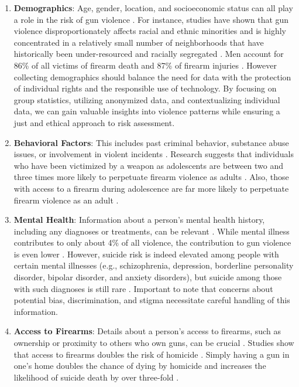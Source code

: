 \documentclass[11pt]{article}
\begin{document}
\begin{enumerate}
\item \textbf{Demographics}: Age, gender, location, and socioeconomic status can all play a role in the risk of gun violence \cite{OToole_2023,kegler2023notes}. For instance, studies have shown that gun violence disproportionately affects racial and ethnic minorities and is highly concentrated in a relatively small number of neighborhoods that have historically been under-resourced and racially segregated \cite{CDC_2023}. Men account for 86\% of all victims of firearm death and 87\% of firearm injuries \cite{edmund2022gun}. However collecting demographics should balance the need for data with the protection of individual rights and the responsible use of technology. By focusing on group statistics, utilizing anonymized data, and contextualizing individual data, we can gain valuable insights into violence patterns while ensuring a just and ethical approach to risk assessment.

\item \textbf{Behavioral Factors}: This includes past criminal behavior, substance abuse issues, or involvement in violent incidents \cite{efsgv_2020,wamser2021understanding}. Research suggests that individuals who have been victimized by a weapon as adolescents are between two and three times more likely to perpetuate firearm violence as adults \cite{Adolescent_gun_violence}. Also, those with access to a firearm during adolescence are far more likely to perpetuate firearm violence as an adult \cite{Adolescent_gun_violence}.

\item \textbf{Mental Health}: Information about a person's mental health history, including any diagnoses or treatments, can be relevant \cite{Ramchand2021-iz,Russell2022-kq,noauthor_2021-yq}. While mental illness contributes to only about 4\% of all violence, the contribution to gun violence is even lower \cite{noauthor_2021-yq}. However, suicide risk is indeed elevated among people with certain mental illnesses (e.g., schizophrenia, depression, borderline personality disorder, bipolar disorder, and anxiety disorders), but suicide among those with such diagnoses is still rare \cite{Ramchand2021-iz}. Important to note that concerns about potential bias, discrimination, and stigma necessitate careful handling of this information. 

\item \textbf{Access to Firearms}: Details about a person's access to firearms, such as ownership or proximity to others who own guns, can be crucial \cite{noauthor_2021-fg,Adolescent_gun_violence,noauthor_2022-qy}. Studies show that access to firearms doubles the risk of homicide \cite{noauthor_2022-qy}. Simply having a gun in one's home doubles the chance of dying by homicide and increases the likelihood of suicide death by over three-fold \cite{noauthor_2021-fg}.


\end{enumerate}
\end{document}
